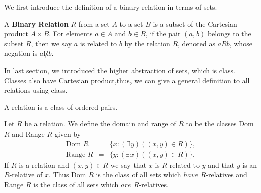 We first introduce the definition of a binary relation in terms of sets. 
\begin{definition}
    A \textbf{Binary Relation} $R$ from a set $A$ to a set $B$ is a subset of the 
    Cartesian product $A \times B$. For elements $a \in A$ and $b \in B$, if the pair 
    $(a, b)$ belongs to the subset $R$, then we say $a$ is related to $b$ by the 
    relation $R$, denoted as $aRb$, whose negation is $a\not R b$.
\end{definition}

In last section, we introduced the higher abstraction of sets, which is class. Classes also have Cartesian
product,thus, we can give a general definition to all relations using class.
\begin{definition}[Relation]
    A relation is a class of ordered pairs.

    Let $R$ be a relation. We define the domain and range of $R$ to be the classes Dom $R$ and Range $R$ 
    given by
$$
\begin{array}{rcl}\text{Dom }R&=&\{x:(\exists y)((x,y)\in R)\},\\\text{Range }R&=&\{y:(\exists x)((x,y)\in R)\}.\end{array}
$$
If $R$ is a relation and $(x,y)\in R$ we say that $x$ is $R$-related to $y$ and that $y$ is an $R$-relative of $x$. 
Thus Dom $R$ is the class of all sets which $have$ $R$-relatives and Range $R$ is the class of all sets which 
$are$ $R$-relatives.
\end{definition}

